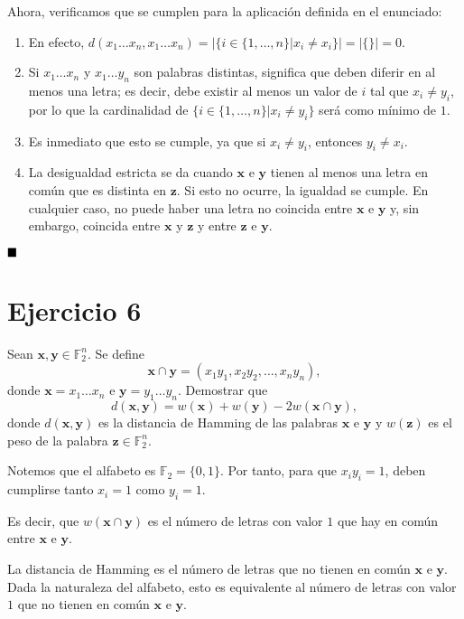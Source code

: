 Ahora, verificamos que se cumplen para la aplicación definida en el enunciado:

\begin{enumerate}[label=\alph*)]
	\item En efecto, $d(x_1\hdots x_n, x_1\hdots x_n) = |\{i\in\{1,\hdots,n\}|x_i\neq x_i\}| = |\{\}| = 0$.
	\item Si $x_1\hdots x_n$ y $x_1\hdots y_n$ son palabras distintas, significa que deben diferir en al menos una letra; es decir, debe existir al menos un valor de $i$ tal que $x_i\neq y_i$, por lo que la cardinalidad de $\{i\in\{1,\hdots,n\}|x_i\neq y_i\}$ será como mínimo de $1$.
	\item Es inmediato que esto se cumple, ya que si $x_i\neq y_i$, entonces $y_i \neq x_i$.
	\item La desigualdad estricta se da cuando $\textbf{x}$ e $\textbf{y}$ tienen al menos una letra en común que es distinta en $\textbf{z}$. Si esto no ocurre, la igualdad se cumple. En cualquier caso, no puede haber una letra no coincida entre $\textbf{x}$ e $\textbf{y}$ y, sin embargo, coincida entre $\textbf{x}$ y $\textbf{z}$ y entre $\textbf{z}$ e $\textbf{y}$.
\end{enumerate}

$\qed$

\section{Ejercicio 6}

\begin{formulationBox}
	Sean $\textbf{x}, \textbf{y} \in \mathbb{F}_2^n$. Se define
	\[\textbf{x}\cap\textbf{y}=(x_1y_1, x_2y_2, \hdots, x_ny_n),\]
	donde $\textbf{x}=x_1\hdots x_n$ e $\textbf{y} = y_1\hdots y_n$. Demostrar que
	\[d(\textbf{x}, \textbf{y}) = w(\textbf{x}) + w(\textbf{y}) - 2w(\textbf{x}\cap\textbf{y}),\]
	donde $d(\textbf{x},\textbf{y})$ es la distancia de Hamming de las palabras $\textbf{x}$ e $\textbf{y}$ y $w(\textbf{z})$ es el peso de la palabra $\textbf{z}\in\mathbb{F}_2^n$.
\end{formulationBox}

Notemos que el alfabeto es $\mathbb{F}_2 = \{0, 1\}$. Por tanto, para que $x_iy_i = 1$, deben cumplirse tanto $x_i = 1$ como $y_i = 1$.

Es decir, que $w(\textbf{x}\cap\textbf{y})$ es el número de letras con valor $1$ que hay en común entre $\textbf{x}$ e $\textbf{y}$.

La distancia de Hamming es el número de letras que no tienen en común $\textbf{x}$ e $\textbf{y}$. Dada la naturaleza del alfabeto, esto es equivalente al número de letras con valor $1$ que no tienen en común $\textbf{x}$ e $\textbf{y}$.

